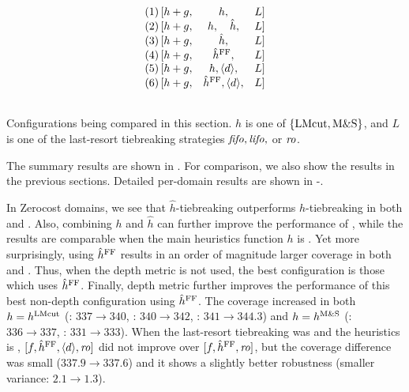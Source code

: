 \begin{table}[htbp]
 \centering
 \[
 \begin{array}{lcll}
  (1)\, [h+g, & h,                           &L] \\\relax
  (2)\, [h+g, & h,     \quad   \hat{h},      &L] \\\relax
  (3)\, [h+g, & \hat{h},                     &L] \\\relax
  (4)\, [h+g, & \hat{h}^{\text{FF}},               &L] \\\relax
  (5)\, [h+g, & h, {\left<d\right>}, &L] \\\relax
  (6)\, [h+g, & \hat{h}^{\text{FF}}, {\left<d\right>}, &L] \\\relax
 \end{array}  
 \]
 \caption{Configurations being compared in this section. $h$ is
 one of ${\left\{\text{LMcut}, \text{M\&S}\right\}}$, and $L$ is one of the last-resort
 tiebreaking strategies ${\text{\textit{fifo}}},{\text{\textit{lifo}}},$ or ${\text{\textit{ro}}}$. }
 \label{list:distance-configs}
\end{table}


The summary results are shown in . For
comparison, we also show the results in the previous sections.
Detailed per-domain results are shown in
-.

In Zerocost domains, we see that $\hat{h}$-tiebreaking outperforms $h$-tiebreaking in both \lmcut and \mands. Also,
combining $h$ and $\hat{h}$ can further improve the performance of \lmcut, while the results are comparable when
the main heuristics function $h$ is \mands.  Yet more surprisingly, using $\hat{h}^{\text{FF}}$ results in an order of magnitude
larger coverage in both \lmcut and \mands. Thus, when the depth metric is not used, the best configuration is those
which uses $\hat{h}^{\text{FF}}$.  Finally, depth metric further improves the performance of this best non-depth configuration
using $\hat{h}^{\text{FF}}$.  The coverage increased in both $h=h^\text{LMcut}$ (\fifo: $337\rightarrow 340$, \lifo: $340\rightarrow
342$, \ro: $341\rightarrow 344.3$) and $h=h^\text{M\&S}$ (\fifo: $336\rightarrow 337$, \lifo: $331\rightarrow
333$). When the last-resort tiebreaking was \ro and the heuristics is \mands, $[f,\hat{h}^{\text{FF}},{\left<d\right>},{\text{\textit{ro}}}]$ did not improve
over $[f,\hat{h}^{\text{FF}},{\text{\textit{ro}}}]$, but the coverage difference was small ($337.9\rightarrow 337.6$) and it shows a slightly
better robustness (smaller variance: $2.1\rightarrow 1.3$).

